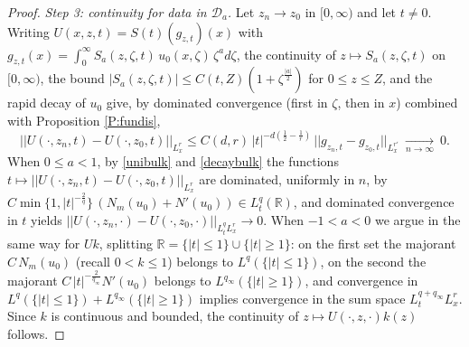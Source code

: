 \documentclass[11pt,letter]{amsart}
\def \R {\mathbb{R}}
\numberwithin{equation}{section}
\numberwithin{equation}{section}
\begin{document}
\begin{proof}
\smallskip
\noindent \emph{Step 3: continuity for data in $\mathcal D_a$.} Let $z_n\to z_0$ in $[0,\infty)$ and let $t\neq0$. Writing $U(x,z,t) = S(t)(g_{z,t})(x)$ with $g_{z,t}(x) = \int_0^\infty S_a(z,\zeta,t)\, u_0(x,\zeta)\,\zeta^a d\zeta$, the continuity of $z\mapsto S_a(z,\zeta,t)$ on $[0,\infty)$, the bound $|S_a(z,\zeta,t)|\le C(t,Z)(1+\zeta^{\frac{|a|}2})$ for $0\le z\le Z$, and the rapid decay of $u_0$ give, by dominated convergence (first in $\zeta$, then in $x$) combined with Proposition \ref{P:fundis},
\[
||U(\cdot,z_n,t)-U(\cdot,z_0,t)||_{L^r_x}\le C(d,r)\, |t|^{-d(\frac12-\frac1r)}\, ||g_{z_n,t}-g_{z_0,t}||_{L^{r'}_x}\ \underset{n\to\infty}{\longrightarrow}\ 0 .
\]
When $0\le a<1$, by \eqref{unibulk} and \eqref{decaybulk} the functions $t\mapsto ||U(\cdot,z_n,t)-U(\cdot,z_0,t)||_{L^r_x}$ are dominated, uniformly in $n$, by $C\min\{1, |t|^{-\frac2q}\}\,(N_m(u_0)+N'(u_0))\in L^q_t(\R)$, and dominated convergence in $t$ yields $||U(\cdot,z_n,\cdot)-U(\cdot,z_0,\cdot)||_{L^q_tL^r_x}\to0$. When $-1<a<0$ we argue in the same way for $Uk$, splitting $\R = \{|t|\le1\}\cup\{|t|\ge1\}$: on the first set the majorant $C\, N_m(u_0)$ (recall $0<k\le1$) belongs to $L^q(\{|t|\le1\})$, on the second the majorant $C\, |t|^{-\frac{2}{q_\infty}}N'(u_0)$ belongs to $L^{q_\infty}(\{|t|\ge1\})$, and convergence in $L^q(\{|t|\le1\}) + L^{q_\infty}(\{|t|\ge1\})$ implies convergence in the sum space $L^{q+q_\infty}_tL^r_x$. Since $k$ is continuous and bounded, the continuity of $z\mapsto U(\cdot,z,\cdot)k(z)$ follows.


\end{proof}
\end{document}
